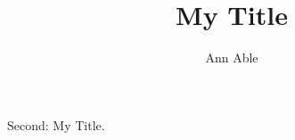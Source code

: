 \documentclass{article}
\author{Ann Able}
\makeatletter
\let\orig@title\title
\renewcommand{\title}[1]{\gdef\firstdef{#1}\orig@title{#1}}
\renewcommand{\title}[1]{\gdef\seconddef{#1}\orig@title{#1}}
\makeatother
\begin{document}
\title{My Title}
\maketitle
Second: \seconddef.
\end{document}

